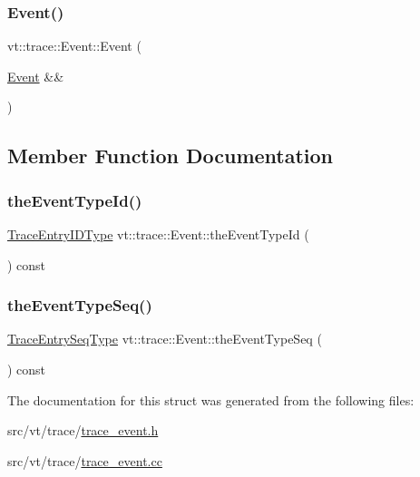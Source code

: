 \mbox{\label{structvt_1_1trace_1_1_event_a286fcf42a1068659e4ce6429c604a8ec}} 
\subsubsection{\texorpdfstring{Event()}{Event()}\hspace{0.1cm}{\footnotesize\ttfamily [3/3]}}
{\footnotesize\ttfamily vt\+::trace\+::\+Event\+::\+Event (\begin{DoxyParamCaption}\item[{\hyperlink{structvt_1_1trace_1_1_event}{Event} \&\&}]{ }\end{DoxyParamCaption})\hspace{0.3cm}{\ttfamily [default]}}



\subsection{Member Function Documentation}
\mbox{\label{structvt_1_1trace_1_1_event_aa977fc8868e6807f1bcf1df8bdc15588}} 
\subsubsection{\texorpdfstring{the\+Event\+Type\+Id()}{theEventTypeId()}}
{\footnotesize\ttfamily \hyperlink{namespacevt_1_1trace_a3c14050715ba9eceaeff51fb3de64f2f}{Trace\+Entry\+I\+D\+Type} vt\+::trace\+::\+Event\+::the\+Event\+Type\+Id (\begin{DoxyParamCaption}{ }\end{DoxyParamCaption}) const}

\mbox{\label{structvt_1_1trace_1_1_event_a8479476d6d9a816d78d0a341df438626}} 
\subsubsection{\texorpdfstring{the\+Event\+Type\+Seq()}{theEventTypeSeq()}}
{\footnotesize\ttfamily \hyperlink{namespacevt_1_1trace_a522028dd2a7d056f0ec3d417836fdecd}{Trace\+Entry\+Seq\+Type} vt\+::trace\+::\+Event\+::the\+Event\+Type\+Seq (\begin{DoxyParamCaption}{ }\end{DoxyParamCaption}) const}



The documentation for this struct was generated from the following files\+:\begin{DoxyCompactItemize}
\item 
src/vt/trace/\hyperlink{trace__event_8h}{trace\+\_\+event.\+h}\item 
src/vt/trace/\hyperlink{trace__event_8cc}{trace\+\_\+event.\+cc}\end{DoxyCompactItemize}
